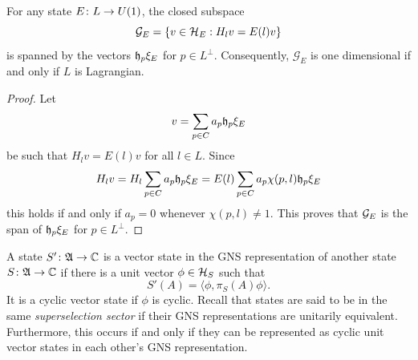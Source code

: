 \documentclass[11pt]{amsart}
\begin{document}
\begin{lem}\label{cor:degenerate}
For any state $E\colon L \to U(1)$, the closed subspace
\[ \mathcal{G}_E =\{v \in \mathcal{H}_E :  H_l v = E(l)v\}\]
is spanned by the vectors $\mathfrak{h}_p\xi_E$ for  $p\in L^\perp$.
Consequently, $\mathcal{G}_E $ is one dimensional if and only if $L$ is Lagrangian.
\end{lem}
\begin{proof}
Let
\[v = \sum_{p\in C} a_p \mathfrak{h}_p  \xi_E\]
be such that $H_l v=E(l)v$ for all $l\in L$.
Since
\[H_l v= H_l\sum_{p \in C} a_p \mathfrak{h}_p  \xi_E=E(l)  \sum_{p \in C} a_p\chi(p,l) \mathfrak{h}_p  \xi_E \]
this holds if and only if $a_p=0$ whenever $\chi(p,l)\neq 1$. This proves that $\mathcal{G}_E$ is the span of $\mathfrak{h}_p  \xi_E$ for $p\in L^\perp$.
\end{proof}


A state $S' \colon \mathfrak{A} \to \mathbb{C}$ is a vector state in the GNS representation of another state $S \colon \mathfrak{A} \to \mathbb{C}$ if there is a unit vector $\phi \in \mathcal{H}_S$ such that
\[ S'(A) = \langle \phi, \pi_S(A)\phi \rangle. \]
It is a cyclic vector state if $\phi$ is cyclic.
Recall that states are said to be in the same \emph{superselection sector} if their GNS representations are unitarily equivalent.  Furthermore, this occurs if and only if they can be represented as cyclic unit vector states in each other's GNS representation.
\end{document}
